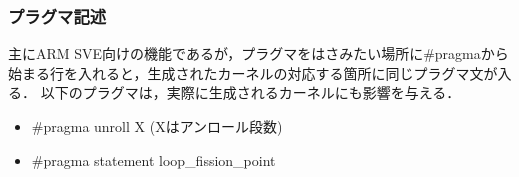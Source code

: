 \documentclass{article}
\begin{document}
\subsubsection{プラグマ記述}
主にARM SVE向けの機能であるが，プラグマをはさみたい場所に\#pragmaから始まる行を入れると，生成されたカーネルの対応する箇所に同じプラグマ文が入る．
以下のプラグマは，実際に生成されるカーネルにも影響を与える．
 \begin{itemize}
  \item \#pragma unroll X (Xはアンロール段数)
  \item \#pragma statement loop\_fission\_point
 \end{itemize}

\end{document}
